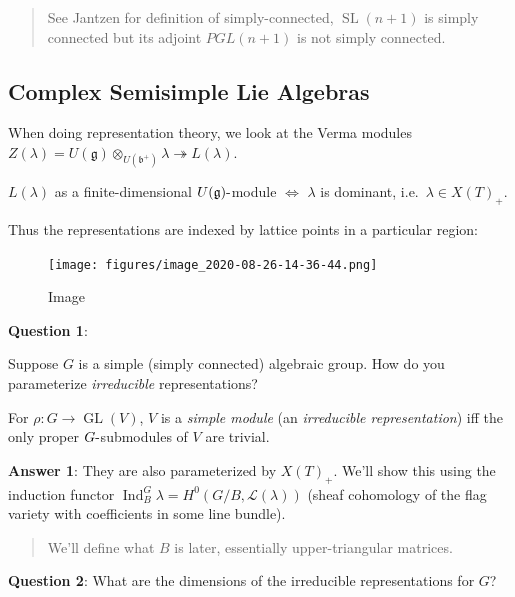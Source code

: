 \begin{quote}
See Jantzen for definition of simply-connected,
\({\operatorname{SL}}(n+1)\) is simply connected but its adjoint
\(PGL(n+1)\) is not simply connected.
\end{quote}

\hypertarget{complex-semisimple-lie-algebras}{%
\subsection{Complex Semisimple Lie
Algebras}\label{complex-semisimple-lie-algebras}}

When doing representation theory, we look at the Verma modules
\(Z(\lambda) = U({\mathfrak{g}}) \otimes_{U({\mathfrak{b}}^+)} \lambda \twoheadrightarrow L(\lambda)\).

\begin{theorem}[?]

\(L(\lambda)\) as a finite-dimensional
\(U({\mathfrak{g}}){\hbox{-}}\)module \(\iff\) \(\lambda\) is dominant,
i.e.~\(\lambda \in X(T)_+\).

\end{theorem}

Thus the representations are indexed by lattice points in a particular
region:

\begin{figure}
\centering
\texttt{[image: figures/image\_2020-08-26-14-36-44.png]}
\caption{Image}
\end{figure}

\textbf{Question 1}:

Suppose \(G\) is a simple (simply connected) algebraic group. How do you
parameterize \emph{irreducible} representations?

For \(\rho: G\to \operatorname{GL}(V)\), \(V\) is a \emph{simple module}
(an \emph{irreducible representation}) iff the only proper
\(G{\hbox{-}}\)submodules of \(V\) are trivial.

\textbf{Answer 1}: They are also parameterized by \(X(T)_+\). We'll show
this using the induction functor
\(\operatorname{Ind}_B^G \lambda =H^0(G/B, \mathcal{L}(\lambda))\)
(sheaf cohomology of the flag variety with coefficients in some line
bundle).

\begin{quote}
We'll define what \(B\) is later, essentially upper-triangular matrices.
\end{quote}

\textbf{Question 2}: What are the dimensions of the irreducible
representations for \(G\)?

